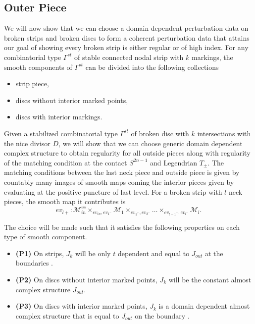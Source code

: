 \subsection{Outer Piece} \label{subsec:outtran}

We will now show that we can choose a domain dependent perturbation data on broken strips and broken discs to form a coherent perturbation data that attains our goal of showing every broken strip is either regular or of high index. For any combinatorial type $\Gamma^{st}$ of stable connected nodal strip with $k$ markings, the smooth components of $\Gamma^{st}$ can be divided into the following collections 
\begin{itemize}
    \item strip piece,
    \item discs without interior marked points,
    \item discs with interior markings.
\end{itemize}
\noindent  Given a stabilized combinatorial type $\Gamma^{st}$ of broken disc with $k$ intersections with the nice divisor $D$, we will show that we can choose generic domain dependent complex structure to obtain regularity for all outside pieces along with regularity of the matching condition at the contact $S^{2n-1}$ and Legendrian $T_\pm$. The matching conditions between the last neck piece and outside piece is given by countably many images of smooth maps coming the interior pieces given by evaluating at the positive puncture of last level. For a broken strip with $l$ neck pieces, the smooth map it contributes is   $$ev_{l+} : \mathcal{M}^{vc}_{in} \times_{ev_{in},ev_{1^-}} \mathcal{M}_1 \times_{ev_{1^+},ev_{2^-}} \dots \times_{ev_{l-1^+},ev_{l^-}}\mathcal{M}_l.$$


\noindent The choice will be made such that it satisfies the following properties on each type of smooth component.

\begin{itemize}
    \item \textbf{(P1)} On strips, $J_k$ will be only $t$ dependent and equal to $J_{out}$ at the boundaries .
    \item  \textbf{(P2)} On discs without interior marked points, $J_k$ will be the constant almost complex structure $J_{out}$.
    \item \textbf{(P3)} On discs with interior marked points, $J_k$ is a domain dependent almost complex structure that is equal to $J_{out}$ on the boundary .
\end{itemize}


